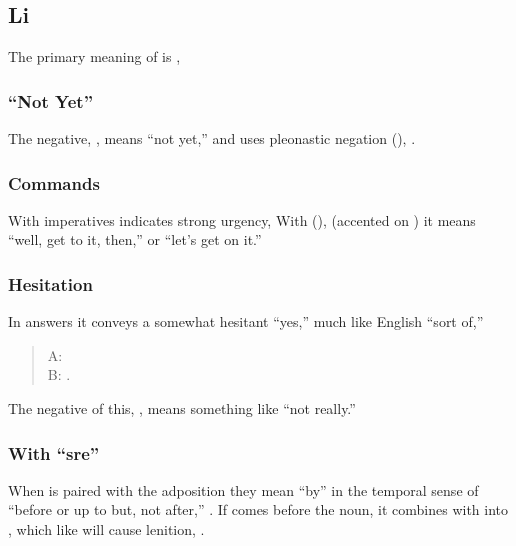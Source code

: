 \subsection{Li}  The primary meaning of  is ,
 

\subsubsection{``Not Yet''} The negative, , means ``not
yet,'' and uses pleonastic negation (),
 .



\subsubsection{Commands} With imperatives  indicates strong
urgency,    With  (),  (accented on ) it means ``well, get to it, then,'' or
``let's get on it.''

\subsubsection{Hesitation} In answers it conveys a somewhat hesitant
``yes,'' much like English ``sort of,''

\begin{quotation}
\noindent A:  \\
\noindent B:  .
\end{quotation}

\noindent The negative of this, , means something like ``not
really.'' 

\subsubsection{With ``sre''} When  is paired with the
adposition  they mean ``by'' in the temporal sense of ``before
or up to but, not after,''  .\label{syn:li:sre} If  comes before the noun, it
combines with  into , which like  will
cause lenition,  .


